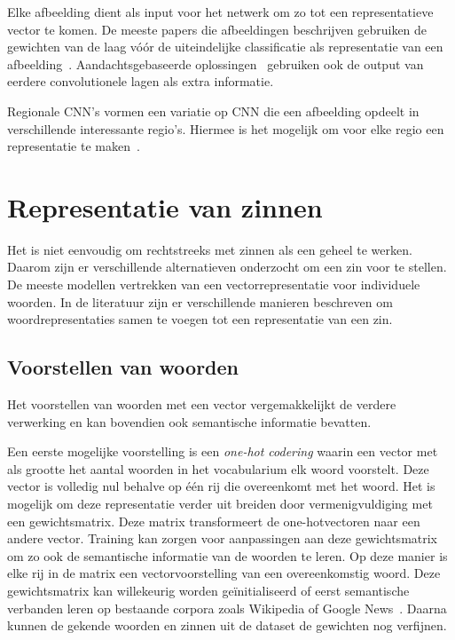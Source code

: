 Elke afbeelding dient als input voor het netwerk om zo tot een representatieve vector te komen. De meeste papers die afbeeldingen beschrijven gebruiken de gewichten van de laag v\'o\'or de uiteindelijke classificatie als representatie van een afbeelding~\cite{Chen2014,Karpathy2015,Mao2014a,Google}. Aandachtsgebaseerde oplossingen~\cite{Jin2015,Xu2015} gebruiken ook de output van eerdere convolutionele lagen als extra informatie.

Regionale CNN's vormen een variatie op CNN die een afbeelding opdeelt in verschillende interessante regio's. Hiermee is het mogelijk om voor elke regio een representatie te maken~\cite{Karpathy2015,Mitchell2015}. 

\section{Representatie van zinnen}
Het is niet eenvoudig om rechtstreeks met zinnen als een geheel te werken. Daarom zijn er verschillende alternatieven onderzocht om een zin voor te stellen.
De meeste modellen vertrekken van een vectorrepresentatie voor individuele woorden. In de literatuur zijn er verschillende manieren beschreven om woordrepresentaties samen te voegen tot een representatie van een zin.

\subsection{Voorstellen van woorden}
 Het voorstellen van woorden met een vector vergemakkelijkt de verdere verwerking en kan bovendien ook semantische informatie bevatten.

 Een eerste mogelijke voorstelling is een \emph{one-hot codering} waarin een vector met als grootte het aantal woorden in het vocabularium elk woord voorstelt. Deze vector is volledig nul behalve op \'e\'en rij die overeenkomt met het woord. Het is mogelijk om deze representatie verder uit breiden door vermenigvuldiging met een gewichtsmatrix. Deze matrix transformeert de one-hotvectoren naar een andere vector. Training kan zorgen voor aanpassingen aan deze gewichtsmatrix om zo ook de semantische informatie van de woorden te leren. Op deze manier is elke rij in de matrix een vectorvoorstelling van een overeenkomstig woord. Deze gewichtsmatrix kan willekeurig worden ge\"initialiseerd of eerst semantische verbanden leren op bestaande corpora zoals Wikipedia of Google News~\cite{Lebret2013,Mao2014a,Google}. Daarna kunnen de gekende woorden en zinnen uit de dataset de gewichten nog verfijnen.  

